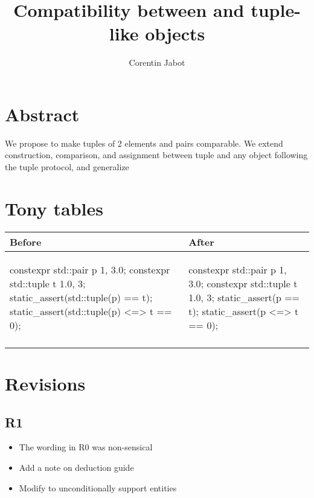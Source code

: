 \documentclass{wg21}
\title{Compatibility between \tcode{tuple} and tuple-like objects}
\author{Corentin Jabot}{corentin.jabot@gmail.com}
\begin{document}
\maketitle


\section{Abstract}

We propose to make tuples of 2 elements and pairs comparable.
We extend construction, comparison, and assignment between tuple and any object following the tuple protocol, and generalize 

\section{Tony tables}
\begin{center}
\begin{tabular}{l|l}
Before & After\\ \hline

\begin{minipage}[t]{0.5\textwidth}
\begin{colorblock}

constexpr std::pair  p {1, 3.0};
constexpr std::tuple t {1.0, 3};
static_assert(std::tuple(p) == t);
static_assert(std::tuple(p) <=> t == 0);

\end{colorblock}
\end{minipage}
&
\begin{minipage}[t]{0.5\textwidth}
\begin{colorblock}

constexpr std::pair  p {1, 3.0};
constexpr std::tuple t {1.0, 3};
static_assert(p == t);
static_assert(p <=> t == 0);

\end{colorblock}
\end{minipage}
\\\\ \hline

\end{tabular}
\end{center}

\section{Revisions}

\subsection{R1}
\begin{itemize}
    \item The wording in R0 was non-sensical 
    \item Add a note on deduction guide
    \item Modify  to unconditionally support  entities 
\end{itemize}
\end{document}
